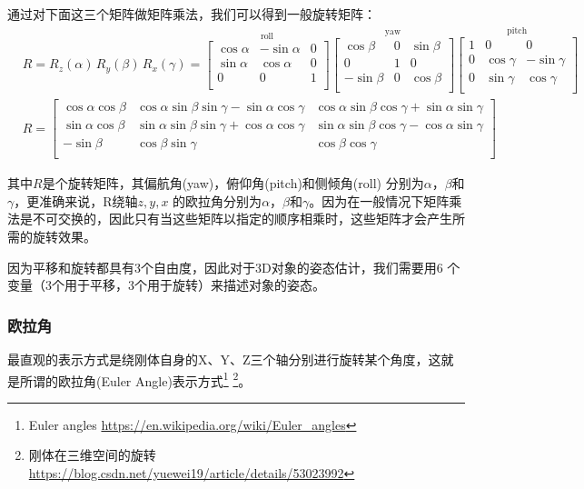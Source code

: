通过对下面这三个矩阵做矩阵乘法，我们可以得到一般旋转矩阵：
\begin{align}
& {\displaystyle R=R_{z}(\alpha )\,R_{y}(\beta )\,R_{x}(\gamma )={\overset {\text{roll}}{\begin{bmatrix}\cos \alpha &-\sin \alpha &0\\\sin \alpha &\cos \alpha &0\\0&0&1\\\end{bmatrix}}}{\overset {\text{yaw}}{\begin{bmatrix}\cos \beta &0&\sin \beta \\0&1&0\\-\sin \beta &0&\cos \beta \\\end{bmatrix}}}{\overset {\text{pitch}}{\begin{bmatrix}1&0&0\\0&\cos \gamma &-\sin \gamma \\0&\sin \gamma &\cos \gamma \\\end{bmatrix}}}} \\
& {\displaystyle R={\begin{bmatrix}\cos \alpha \cos \beta &\cos \alpha \sin \beta \sin \gamma -\sin \alpha \cos \gamma &\cos \alpha \sin \beta \cos \gamma +\sin \alpha \sin \gamma \\\sin \alpha \cos \beta &\sin \alpha \sin \beta \sin \gamma +\cos \alpha \cos \gamma &\sin \alpha \sin \beta \cos \gamma -\cos \alpha \sin \gamma \\-\sin \beta &\cos \beta \sin \gamma &\cos \beta \cos \gamma \\\end{bmatrix}}}
\end{align}

其中$R$是个旋转矩阵，其偏航角(yaw)，俯仰角(pitch)和侧倾角(roll) 分别为$\alpha$，$\beta$和$\gamma$，更准确来说，R绕轴$z,y,x$ 的欧拉角分别为$\alpha$，$\beta$和$\gamma$。因为在一般情况下矩阵乘法是不可交换的，因此只有当这些矩阵以指定的顺序相乘时，这些矩阵才会产生所需的旋转效果。

因为平移和旋转都具有3个自由度，因此对于3D对象的姿态估计，我们需要用6 个变量（3个用于平移，3个用于旋转）来描述对象的姿态。

\subsubsection{欧拉角}

最直观的表示方式是绕刚体自身的X、Y、Z三个轴分别进行旋转某个角度，这就是所谓的欧拉角(Euler Angle)表示方式\footnote{Euler angles \quad \url{https://en.wikipedia.org/wiki/Euler_angles}} \footnote{刚体在三维空间的旋转 \quad \url{https://blog.csdn.net/yuewei19/article/details/53023992}}。

